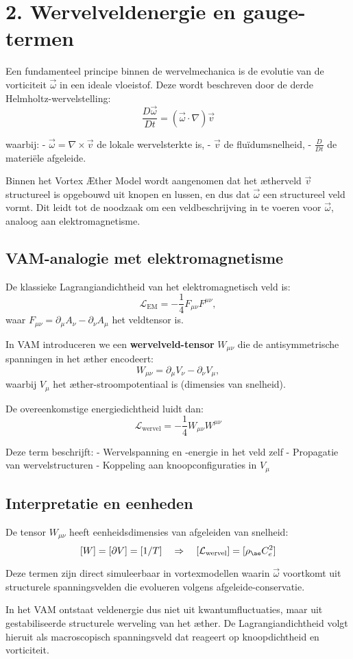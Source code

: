 \section*{2. Wervelveldenergie en gauge-termen}

Een fundamenteel principe binnen de wervelmechanica is de evolutie van de vorticiteit $\vec{\omega}$ in een ideale vloeistof. Deze wordt beschreven door de derde Helmholtz-wervelstelling:
\[
    \frac{D \vec{\omega}}{Dt} = (\vec{\omega} \cdot \nabla) \vec{v}
\]

waarbij:
- $\vec{\omega} = \nabla \times \vec{v}$ de lokale wervelsterkte is,
- $\vec{v}$ de fluïdumsnelheid,
- $\frac{D}{Dt}$ de materiële afgeleide.

Binnen het Vortex Æther Model wordt aangenomen dat het ætherveld $\vec{v}$ structureel is opgebouwd uit knopen en lussen, en dus dat $\vec{\omega}$ een structureel veld vormt. Dit leidt tot de noodzaak om een veldbeschrijving in te voeren voor $\vec{\omega}$, analoog aan elektromagnetisme.

\subsection*{VAM-analogie met elektromagnetisme}
De klassieke Lagrangiandichtheid van het elektromagnetisch veld is:
\[
    \mathcal{L}_{\text{EM}} = -\frac{1}{4} F_{\mu\nu} F^{\mu\nu},
\]
waar $F_{\mu\nu} = \partial_\mu A_\nu - \partial_\nu A_\mu$ het veldtensor is.

In VAM introduceren we een \textbf{wervelveld-tensor} $W_{\mu\nu}$ die de antisymmetrische spanningen in het æther encodeert:
\[
    W_{\mu\nu} = \partial_\mu V_\nu - \partial_\nu V_\mu,
\]
waarbij $V_\mu$ het æther-stroompotentiaal is (dimensies van snelheid).

De overeenkomstige energiedichtheid luidt dan:
\[
    \mathcal{L}_{\text{wervel}} = -\frac{1}{4} W_{\mu\nu} W^{\mu\nu}
\]

Deze term beschrijft:
- Wervelspanning en -energie in het veld zelf
- Propagatie van wervelstructuren
- Koppeling aan knoopconfiguraties in $V_\mu$

\subsection*{Interpretatie en eenheden}
De tensor $W_{\mu\nu}$ heeft eenheidsdimensies van afgeleiden van snelheid:
\[
    [W] = [\partial V] = [1/T] \quad \Rightarrow \quad [\mathcal{L}_{\text{wervel}}] = [\rho_{\ae} C_e^2]
\]

Deze termen zijn direct simuleerbaar in vortexmodellen waarin $\vec{\omega}$ voortkomt uit structurele spanningsvelden die evolueren volgens afgeleide-conservatie.

In het VAM ontstaat veldenergie dus niet uit kwantumfluctuaties, maar uit gestabiliseerde structurele werveling van het æther. De Lagrangiandichtheid volgt hieruit als macroscopisch spanningsveld dat reageert op knoopdichtheid en vorticiteit.